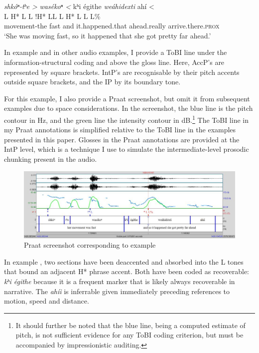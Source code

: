 \documentclass[output=paper]{LSP/langsci}
\begin{document}
\glll 	\emph{shkóⁿ-tʰe >}	\emph{wasékoⁿ <}		kʰi 		égithe 		\emph{weáhidexti}		{ahí <}\\
	{\ob L H* L\cb}		{\ob L !H* L\cb{}L}		{\ob L}	{}			{H* L}				{\cb{}L L\%}\\
	movement-the 		fast 				and 		it.happened.that 	ahead.really	 		arrive.there.\textsc{prox}\\
\glt `She was moving fast, so it happened that she got pretty far ahead.'
\z

In example  and in other audio examples, I provide a ToBI line under the information-structural coding and above the gloss line. Here, AccP’s are represented by square brackets. IntP’s are recognisable by their pitch accents outside square brackets, and the IP by its boundary tone. 

For this example, I also provide a Praat \citep{BoersmaWeenink1992} screenshot, but omit it from subsequent examples due to space considerations. In the screenshot, the blue line is the pitch contour in Hz, and the green line the intensity contour in dB.\footnote{It should further be noted that the blue line, being a computed estimate of pitch, is not sufficient evidence for any ToBI coding criterion, but must be accompanied by impressionistic auditing.} The ToBI line in my Praat annotations is simplified relative to the ToBI line in the examples presented in this paper. Glosses in the Praat annotations are provided at the IntP level, which is a technique I use to simulate the intermediate-level prosodic chunking present in the audio.

\begin{figure}\includegraphics[width=12cm]{figures/Gordon1}\caption{Praat screenshot corresponding to example }\label{wolfedeaccentingscreenshot}\end{figure}

In example , two sections have been deaccented and absorbed into the L tones that bound an adjacent H* phrase accent. Both have been coded as recoverable: \textit{kʰi égithe} because it is a frequent  marker that is likely always recoverable in narrative. The  \textit{ahíi} is inferrable given immediately preceding references to motion, speed and distance.
\end{document}
